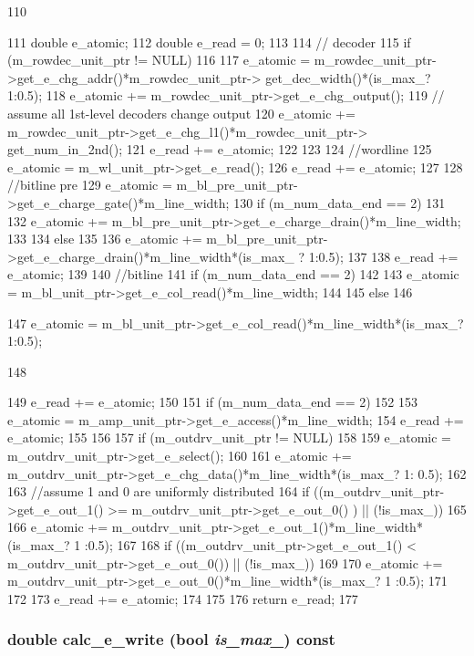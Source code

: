\begin{DoxyCode}
110 {
111     double e_atomic;
112     double e_read = 0;
113 
114     // decoder
115     if (m_rowdec_unit_ptr != NULL)
116     {
117         e_atomic = m_rowdec_unit_ptr->get_e_chg_addr()*m_rowdec_unit_ptr->
      get_dec_width()*(is_max_? 1:0.5);
118         e_atomic += m_rowdec_unit_ptr->get_e_chg_output();
119         // assume all 1st-level decoders change output
120         e_atomic += m_rowdec_unit_ptr->get_e_chg_l1()*m_rowdec_unit_ptr->
      get_num_in_2nd();
121         e_read += e_atomic;
122     }
123 
124     //wordline
125     e_atomic = m_wl_unit_ptr->get_e_read();
126     e_read += e_atomic;
127 
128     //bitline pre
129     e_atomic = m_bl_pre_unit_ptr->get_e_charge_gate()*m_line_width;
130     if (m_num_data_end == 2)
131     {
132         e_atomic += m_bl_pre_unit_ptr->get_e_charge_drain()*m_line_width;
133     }
134     else
135     {
136         e_atomic += m_bl_pre_unit_ptr->get_e_charge_drain()*m_line_width*(is_max_
      ? 1:0.5);
137     }
138     e_read += e_atomic;
139 
140     //bitline
141     if (m_num_data_end == 2)
142     {
143         e_atomic = m_bl_unit_ptr->get_e_col_read()*m_line_width;
144     }
145     else
146     {
147         e_atomic = m_bl_unit_ptr->get_e_col_read()*m_line_width*(is_max_? 1:0.5);
      
148     }
149     e_read += e_atomic;
150 
151     if (m_num_data_end == 2)
152     {
153         e_atomic = m_amp_unit_ptr->get_e_access()*m_line_width;
154         e_read += e_atomic;
155     }
156 
157     if (m_outdrv_unit_ptr != NULL)
158     {
159         e_atomic = m_outdrv_unit_ptr->get_e_select();
160 
161         e_atomic += m_outdrv_unit_ptr->get_e_chg_data()*m_line_width*(is_max_? 1:
      0.5);
162 
163         //assume 1 and 0 are uniformly distributed
164         if ((m_outdrv_unit_ptr->get_e_out_1() >= m_outdrv_unit_ptr->get_e_out_0()
      ) || (!is_max_))
165         {
166             e_atomic += m_outdrv_unit_ptr->get_e_out_1()*m_line_width*(is_max_? 1
      :0.5);
167         }
168         if ((m_outdrv_unit_ptr->get_e_out_1() < m_outdrv_unit_ptr->get_e_out_0())
       || (!is_max_))
169         {
170             e_atomic += m_outdrv_unit_ptr->get_e_out_0()*m_line_width*(is_max_? 1
      :0.5);
171         }
172 
173         e_read += e_atomic;
174     }
175 
176     return e_read;
177 }
\end{DoxyCode}
\hypertarget{classSRAM_a3ea79b0e93868572161314a61e384360}{
\subsubsection[{calc\_\-e\_\-write}]{\setlength{\rightskip}{0pt plus 5cm}double calc\_\-e\_\-write (bool {\em is\_\-max\_\-}) const}}
\label{classSRAM_a3ea79b0e93868572161314a61e384360}



